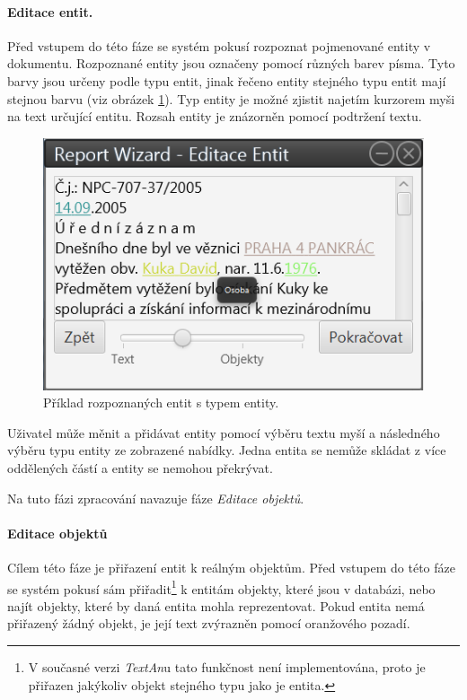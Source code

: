 \documentclass[12pt,a4paper]{report}
\newcommand{\textan}{\emph{TextAn}}
\begin{document}
\paragraph{Editace entit.}
Před vstupem do této fáze se systém pokusí rozpoznat pojmenované entity v dokumentu. Rozpoznané entity jsou označeny pomocí různých barev písma. Tyto barvy jsou určeny podle typu entit, jinak řečeno entity stejného typu entit mají stejnou barvu (viz obrázek \ref{fig:Entity}). Typ entity je možné zjistit najetím kurzorem myši na text určující entitu. Rozsah entity je znázorněn pomocí podtržení textu.

\begin{figure}[!htb]
	\centering
	\includegraphics[width=\textwidth]{entity}
	\caption{Příklad rozpoznaných entit s typem entity.}
	\label{fig:Entity}
\end{figure}

Uživatel může měnit a přidávat entity pomocí výběru textu myší a následného výběru typu entity ze zobrazené nabídky. Jedna entita se nemůže skládat z více oddělených částí a entity se nemohou překrývat.

Na tuto fázi zpracování navazuje fáze \emph{Editace objektů}.

\paragraph{Editace objektů}
Cílem této fáze je přiřazení entit k reálným objektům. Před vstupem do této fáze se systém pokusí sám přiřadit\footnote{V současné verzi \textan u tato funkčnost není implementována, proto je přiřazen jakýkoliv objekt stejného typu jako je entita.} k entitám objekty, které jsou v databázi, nebo najít objekty, které by daná entita mohla reprezentovat. Pokud entita nemá přiřazený žádný objekt, je její text zvýrazněn pomocí oranžového pozadí.
\end{document}
